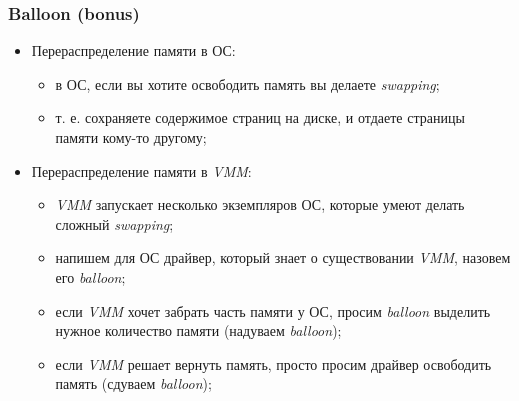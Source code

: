 \begin{frame}
\frametitle{Balloon (bonus)}
\begin{itemize}
  \item<1-> Перераспределение памяти в ОС:
    \begin{itemize}
      \item в ОС, если вы хотите освободить память вы делаете \emph{swapping};
      \item т. е. сохраняете содержимое страниц на диске, и отдаете страницы
            памяти кому-то другому;
    \end{itemize}
  \item<2-> Перераспределение памяти в \emph{VMM}:
    \begin{itemize}
      \item \emph{VMM} запускает несколько экземпляров ОС, которые умеют делать
            сложный \emph{swapping};
      \item напишем для ОС драйвер, который знает о существовании \emph{VMM},
            назовем его \emph{balloon};
      \item если \emph{VMM} хочет забрать часть памяти у ОС, просим
            \emph{balloon} выделить нужное количество памяти (надуваем
            \emph{balloon});
      \item если \emph{VMM} решает вернуть память, просто просим драйвер
            освободить память (сдуваем \emph{balloon});
    \end{itemize}
\end{itemize}
\end{frame}
